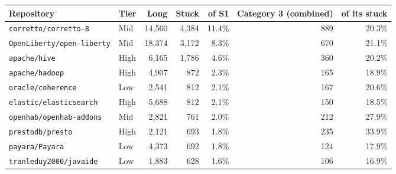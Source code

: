 \begin{tabular}{llrrrrr}
\toprule
Repository & Tier & Long & Stuck & of S1 & Category 3 (combined) & of its stuck \\
\midrule
\texttt{corretto/\allowbreak corretto-8} & Mid & 14{,}560 & 4{,}384 & 11.4\% & 889 & 20.3\% \\
\texttt{OpenLiberty/\allowbreak open-liberty} & Mid & 18{,}374 & 3{,}172 & 8.3\% & 670 & 21.1\% \\
\texttt{apache/\allowbreak hive} & High & 6{,}165 & 1{,}786 & 4.6\% & 360 & 20.2\% \\
\texttt{apache/\allowbreak hadoop} & High & 4{,}907 & 872 & 2.3\% & 165 & 18.9\% \\
\texttt{oracle/\allowbreak coherence} & Low & 2{,}541 & 812 & 2.1\% & 167 & 20.6\% \\
\texttt{elastic/\allowbreak elasticsearch} & High & 5{,}688 & 812 & 2.1\% & 150 & 18.5\% \\
\texttt{openhab/\allowbreak openhab-addons} & Mid & 2{,}821 & 761 & 2.0\% & 212 & 27.9\% \\
\texttt{prestodb/\allowbreak presto} & High & 2{,}121 & 693 & 1.8\% & 235 & 33.9\% \\
\texttt{payara/\allowbreak Payara} & Low & 4{,}373 & 692 & 1.8\% & 124 & 17.9\% \\
\texttt{tranleduy2000/\allowbreak javaide} & Low & 1{,}883 & 628 & 1.6\% & 106 & 16.9\% \\
\bottomrule
\end{tabular}
